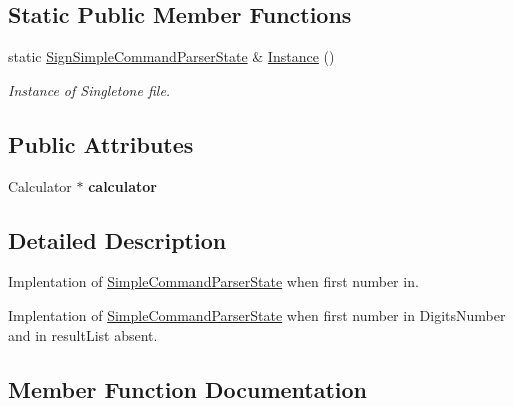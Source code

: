 \subsection*{Static Public Member Functions}
\begin{DoxyCompactItemize}
\item 
\hypertarget{class_sign_simple_command_parser_state_a64d6c335cbdf66d939927de9b0fb5485}{}static \hyperlink{class_sign_simple_command_parser_state}{Sign\+Simple\+Command\+Parser\+State} \& \hyperlink{class_sign_simple_command_parser_state_a64d6c335cbdf66d939927de9b0fb5485}{Instance} ()\label{class_sign_simple_command_parser_state_a64d6c335cbdf66d939927de9b0fb5485}

\begin{DoxyCompactList}\small\item\em Instance of Singletone file. \end{DoxyCompactList}\end{DoxyCompactItemize}
\subsection*{Public Attributes}
\begin{DoxyCompactItemize}
\item 
\hypertarget{class_sign_simple_command_parser_state_aaf2274f83e8590b209f499b26d68f874}{}Calculator $\ast$ {\bfseries calculator}\label{class_sign_simple_command_parser_state_aaf2274f83e8590b209f499b26d68f874}

\end{DoxyCompactItemize}


\subsection{Detailed Description}
Implentation of \hyperlink{class_simple_command_parser_state}{Simple\+Command\+Parser\+State} when first number in. 

Implentation of \hyperlink{class_simple_command_parser_state}{Simple\+Command\+Parser\+State} when first number in Digits\+Number and in result\+List absent. 

\subsection{Member Function Documentation}
\hypertarget{class_sign_simple_command_parser_state_a7e816080deee6dbc8e5465ce6875335f}{}
